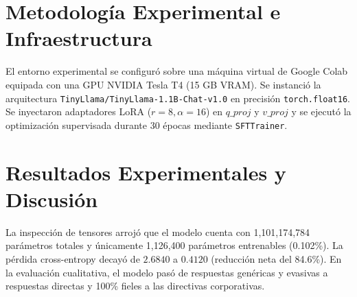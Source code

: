 \documentclass[12pt,letterpaper]{article}
\begin{document}
\section{Metodología Experimental e Infraestructura}
El entorno experimental se configuró sobre una máquina virtual de Google Colab equipada con una GPU NVIDIA Tesla T4 (15 GB VRAM). Se instanció la arquitectura \texttt{TinyLlama/TinyLlama-1.1B-Chat-v1.0} en precisión \texttt{torch.float16}. Se inyectaron adaptadores LoRA ($r=8, \alpha=16$) en $q\_proj$ y $v\_proj$ y se ejecutó la optimización supervisada durante 30 épocas mediante \texttt{SFTTrainer}.

\section{Resultados Experimentales y Discusión}
La inspección de tensores arrojó que el modelo cuenta con 1,101,174,784 parámetros totales y únicamente 1,126,400 parámetros entrenables (0.102\%). La pérdida cross-entropy decayó de $2.6840$ a $0.4120$ (reducción neta del 84.6\%). En la evaluación cualitativa, el modelo pasó de respuestas genéricas y evasivas a respuestas directas y 100\% fieles a las directivas corporativas.
\end{document}
